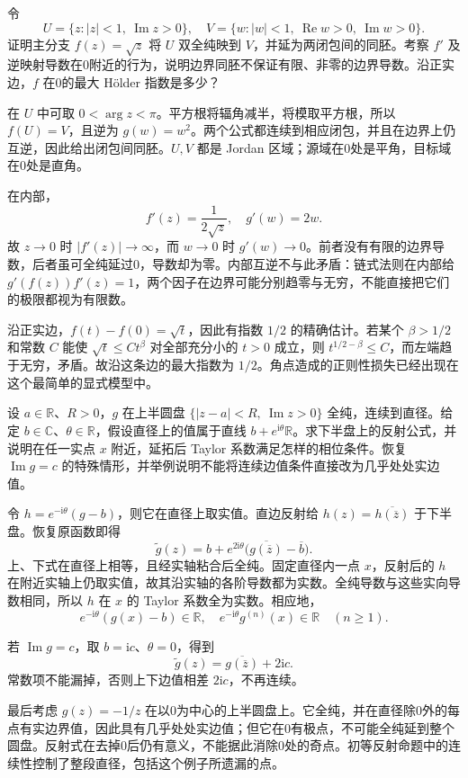 \begin{exercise}\label{b3:ex:07-2}
令
\[
 U=\{z:|z|<1,\ \operatorname{Im}z>0\},\quad
 V=\{w:|w|<1,\ \operatorname{Re}w>0,\ \operatorname{Im}w>0\}.
\]
证明主分支 \(f(z)=\sqrt z\) 将 \(U\) 双全纯映到 \(V\)，并延为两闭包间的同胚。考察 \(f'\) 及逆映射导数在0附近的行为，说明边界同胚不保证有限、非零的边界导数。沿正实边，\(f\) 在0的最大 Hölder 指数是多少？
\end{exercise}
\begin{solution}
在 \(U\) 中可取 \(0<\arg z<\pi\)。平方根将辐角减半，将模取平方根，所以 \(f(U)=V\)，且逆为 \(g(w)=w^2\)。两个公式都连续到相应闭包，并且在边界上仍互逆，因此给出闭包间同胚。\(U,V\) 都是 Jordan 区域；源域在0处是平角，目标域在0处是直角。

在内部，
\[
 f'(z)=\frac1{2\sqrt z},\quad g'(w)=2w.
\]
故 \(z\to0\) 时 \(|f'(z)|\to\infty\)，而 \(w\to0\) 时 \(g'(w)\to0\)。前者没有有限的边界导数，后者虽可全纯延过0，导数却为零。内部互逆不与此矛盾：链式法则在内部给 \(g'(f(z))f'(z)=1\)，两个因子在边界可能分别趋零与无穷，不能直接把它们的极限都视为有限数。

沿正实边，\(f(t)-f(0)=\sqrt t\)，因此有指数 \(1/2\) 的精确估计。若某个 \(\beta>1/2\) 和常数 \(C\) 能使 \(\sqrt t\le Ct^\beta\) 对全部充分小的 \(t>0\) 成立，则
\(t^{1/2-\beta}\le C\)，而左端趋于无穷，矛盾。故沿这条边的最大指数为 \(1/2\)。角点造成的正则性损失已经出现在这个最简单的显式模型中。
\end{solution}

\begin{exercise}\label{b3:ex:07-3}
设 \(a\in\mathbb R\)、\(R>0\)，\(g\) 在上半圆盘
\(\{|z-a|<R,\ \operatorname{Im}z>0\}\) 全纯，连续到直径。给定 \(b\in\mathbb C\)、\(\theta\in\mathbb R\)，假设直径上的值属于直线 \(b+e^{\mathrm i\theta}\mathbb R\)。求下半盘上的反射公式，并说明在任一实点 \(x\) 附近，延拓后 Taylor 系数满足怎样的相位条件。恢复 \(\operatorname{Im}g=c\) 的特殊情形，并举例说明不能将连续边值条件直接改为几乎处处实边值。
\end{exercise}
\begin{solution}
令 \(h=e^{-\mathrm i\theta}(g-b)\)，则它在直径上取实值。直边反射给
\(h(z)=\overline{h(\overline z)}\) 于下半盘。恢复原函数即得
\[
 \widetilde g(z)
 =b+e^{2\mathrm i\theta}\bigl(\overline{g(\overline z)}-\overline b\bigr).
\]
上、下式在直径上相等，且经实轴粘合后全纯。固定直径内一点 \(x\)，反射后的 \(h\) 在附近实轴上仍取实值，故其沿实轴的各阶导数都为实数。全纯导数与这些实向导数相同，所以 \(h\) 在 \(x\) 的 Taylor 系数全为实数。相应地，
\[
 e^{-\mathrm i\theta}(g(x)-b)\in\mathbb R,\quad
 e^{-\mathrm i\theta}g^{(n)}(x)\in\mathbb R\quad(n\ge1).
\]

若 \(\operatorname{Im}g=c\)，取 \(b=\mathrm i c\)、\(\theta=0\)，得到
\[
 \widetilde g(z)=\overline{g(\overline z)}+2\mathrm i c.
\]
常数项不能漏掉，否则上下边值相差 \(2\mathrm i c\)，不再连续。

最后考虑 \(g(z)=-1/z\) 在以0为中心的上半圆盘上。它全纯，并在直径除0外的每点有实边界值，因此具有几乎处处实边值；但它在0有极点，不可能全纯延到整个圆盘。反射式在去掉0后仍有意义，不能据此消除0处的奇点。初等反射命题中的连续性控制了整段直径，包括这个例子所遗漏的点。
\end{solution}

